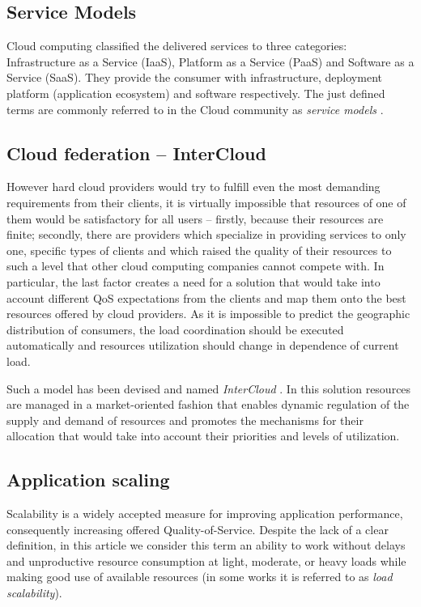 \documentclass[twocolumn]{svjour3}          %
\begin{document}
\subsection{Service Models}
Cloud computing classified the delivered services to three categories: Infrastructure as a Service (IaaS), Platform as a Service (PaaS) and Software as a Service (SaaS). They provide the consumer with infrastructure, deployment platform (application ecosystem) and software respectively. The just defined terms are commonly referred to in the Cloud community as \emph{service models} \cite{NIST}.

\subsection{Cloud federation -- InterCloud}
However hard cloud providers would try to fulfill even the most demanding requirements from their clients, it is virtually impossible that resources of one of them would be satisfactory for all users -- firstly, because their resources are finite; secondly, there are providers which specialize in providing services to only one, specific types of clients and which raised the quality of their resources to such a level that other cloud computing companies cannot compete with.
In particular, the last factor creates a need for a solution that would take into account different QoS expectations from the clients and map them onto the best resources offered by cloud providers. As it is impossible to predict the geographic distribution of consumers, the load coordination should be executed automatically and resources utilization should change in dependence of current load.

Such a model has been devised and named \emph{InterCloud} \cite{InterCloud}. In this solution resources are managed in a market-oriented \cite{MarketOriented} fashion that enables dynamic regulation of the supply and demand of resources and promotes the mechanisms for their allocation that would take into account their priorities and levels of utilization.

\subsection{Application scaling}
Scalability is a widely accepted measure for improving application performance, consequently increasing offered Quality-of-Service. Despite the lack of a clear definition, in this article we consider this term an ability to work without delays and unproductive resource consumption at light, moderate, or heavy loads while making good use of available resources \cite{ScalabilityTerm} (in some works it is referred to as \emph{load scalability}).
\end{document}
